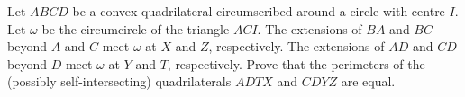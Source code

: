 Let $ABCD$ be a convex quadrilateral circumscribed around a circle with centre $I$. Let $\omega$ be the circumcircle of the triangle $ACI$. The extensions of $BA$ and $BC$ beyond $A$ and $C$ meet $\omega$ at $X$ and $Z$, respectively. The extensions of $AD$ and $CD$ beyond $D$ meet $\omega$ at $Y$ and $T$, respectively. Prove that the perimeters of the (possibly self-intersecting) quadrilaterals $ADTX$ and $CDYZ$ are equal.
